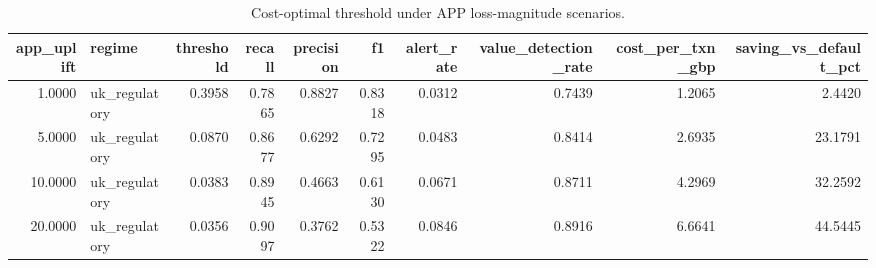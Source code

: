 \begin{table}
\caption{Cost-optimal threshold under APP loss-magnitude scenarios.}
\label{tab:table6_sensitivity_app_uplift}
\begin{tabular}{rlrrrrrrrr}
\toprule
app\_uplift & regime & threshold & recall & precision & f1 & alert\_rate & value\_detection\_rate & cost\_per\_txn\_gbp & saving\_vs\_default\_pct \\
\midrule
1.0000 & uk\_regulatory & 0.3958 & 0.7865 & 0.8827 & 0.8318 & 0.0312 & 0.7439 & 1.2065 & 2.4420 \\
5.0000 & uk\_regulatory & 0.0870 & 0.8677 & 0.6292 & 0.7295 & 0.0483 & 0.8414 & 2.6935 & 23.1791 \\
10.0000 & uk\_regulatory & 0.0383 & 0.8945 & 0.4663 & 0.6130 & 0.0671 & 0.8711 & 4.2969 & 32.2592 \\
20.0000 & uk\_regulatory & 0.0356 & 0.9097 & 0.3762 & 0.5322 & 0.0846 & 0.8916 & 6.6641 & 44.5445 \\
\bottomrule
\end{tabular}
\end{table}

